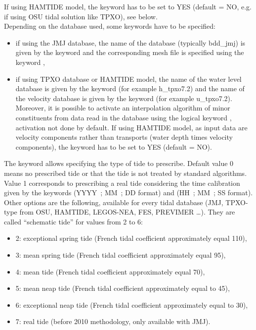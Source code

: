 If using HAMTIDE model, the keyword
 has to be set to YES
(default = NO, e.g. if using OSU tidal solution like TPXO), see below.
\\

Depending on the database used, some keywords have to be specified:

\begin{itemize}
\item if using the JMJ database, the name of the database (typically bdd\_jmj)
is given by the keyword  and the corresponding
mesh file is specified using the keyword ,

\item if using TPXO database or HAMTIDE model, the name of the water level
database is given
by the keyword  (for example h\_tpxo7.2)
and the name of the velocity database is given by the keyword
 (for example u\_tpxo7.2).
Moreover, it is possible to activate an interpolation algorithm of minor
constituents from data read in the database using the logical keyword
, activation not done by default.
If using HAMTIDE model, as input data are velocity components rather than
transports (water depth times velocity components), the keyword
 has to be set to YES
(default = NO).
\end{itemize}

The keyword  allows specifying
the type of tide to prescribe.
Default value 0 means no prescribed tide or that the tide is not treated by
standard algorithms.
Value 1 corresponds to prescribing a real tide considering the time calibration
given by the keywords  (YYYY~; MM~; DD format) and
 (HH~; MM~; SS format).
Other options are the following, available for every tidal database (JMJ,
TPXO-type from OSU, HAMTIDE, LEGOS-NEA, FES, PREVIMER \ldots).
They are called “schematic tide” for values from 2 to 6:

\begin{itemize}
\item 2: exceptional spring tide (French tidal coefficient
 approximately equal 110),

\item 3: mean spring tide (French tidal coefficient approximately
 equal 95),

\item 4: mean tide (French tidal coefficient approximately equal 70),

\item 5: mean neap tide (French tidal coefficient approximately
equal to 45),

\item 6: exceptional neap tide (French tidal coefficient
approximately equal to 30),

\item 7: real tide (before 2010 methodology, only available
with JMJ).
\end{itemize}

